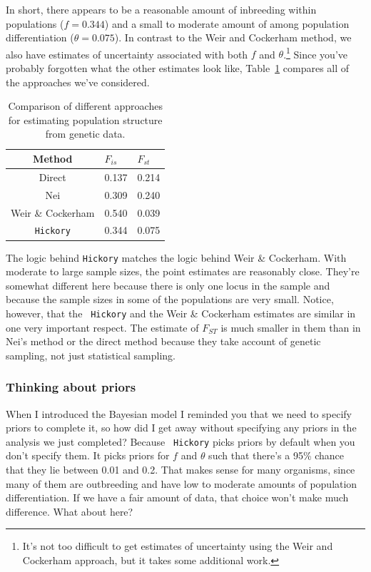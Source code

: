 \documentclass[12pt]{article}
\begin{document}
In short, there appears to be a reasonable amount of inbreeding within
populations ($f = 0.344$) and a small to moderate amount of among
population differentiation ($\theta = 0.075$). In contrast to the Weir
and Cockerham method, we also have estimates of uncertainty associated
with both $f$ and $\theta$.\footnote{It's not too difficult to get
  estimates of uncertainty using the Weir and Cockerham approach, but
  it takes some additional work.} Since you've probably forgotten what
the other estimates look like, Table~\ref{table:hickory-comparison}
compares all of the approaches we've considered.

\begin{table}
\begin{center}
  \begin{tabular}{c|ll}
\hline\hline
Method & $F_{is}$ & $F_{st}$ \\
\hline
Direct            & 0.137 & 0.214 \\
Nei               & 0.309 & 0.240 \\
Weir \& Cockerham & 0.540 & 0.039 \\
{\tt Hickory}     & 0.344 & 0.075 \\
\hline
\end{tabular}
\end{center}
\caption{Comparison of different approaches for estimating population
  structure from genetic data.}\label{table:hickory-comparison}
\end{table}

The logic behind {\tt Hickory\/} matches the logic behind Weir \&
Cockerham. With moderate to large sample sizes, the point estimates
are reasonably close. They're somewhat different here because there is
only one locus in the sample and because the sample sizes in some of
the populations are very small. Notice, however, that the {\tt
  Hickory} and the Weir \& Cockerham estimates are similar in one very
important respect. The estimate of $F_{ST}$ is much smaller in them
than in Nei's method or the direct method because they take account of
genetic sampling, not just statistical sampling.

\subsubsection*{Thinking about priors}

When I introduced the Bayesian model I reminded you that we need to
specify priors to complete it, so how did I get away without
specifying any priors in the analysis we just completed? Because {\tt
  Hickory} picks priors by default when you don't specify them. It
picks priors for $f$ and $\theta$ such that there's a 95\% chance that
they lie between 0.01 and 0.2. That makes sense for many organisms,
since many of them are outbreeding and have low to moderate amounts of
population differentiation. If we have a fair amount of data, that
choice won't make much difference. What about here?
\end{document}
